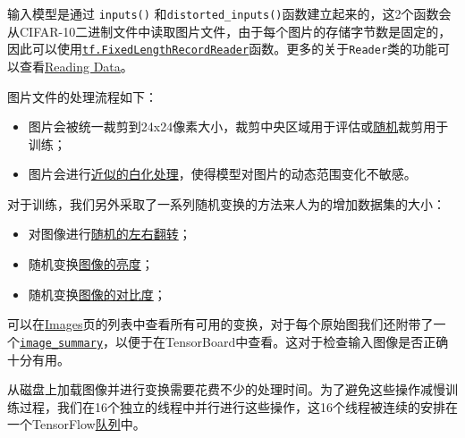 输入模型是通过 \texttt{inputs()}
和\texttt{distorted\_inputs()}函数建立起来的，这2个函数会从CIFAR-10二进制文件中读取图片文件，由于每个图片的存储字节数是固定的，因此可以使用\href{https://github.com/jikexueyuanwiki/tensorflow-zh/blob/master/SOURCE/api_docs/python/io_ops.md\#FixedLengthRecordReader}{\texttt{tf.FixedLengthRecordReader}}函数。更多的关于\texttt{Reader}类的功能可以查看\href{https://github.com/jikexueyuanwiki/tensorflow-zh/blob/master/SOURCE/how_tos/reading_data/index.md\#reading-from-files}{Reading
Data}。

图片文件的处理流程如下：

\begin{itemize}
\tightlist
\item
  图片会被统一裁剪到24x24像素大小，裁剪中央区域用于评估或\href{https://github.com/jikexueyuanwiki/tensorflow-zh/blob/master/SOURCE/api_docs/python/image.md\#random_crop}{随机}裁剪用于训练；
\item
  图片会进行\href{https://github.com/jikexueyuanwiki/tensorflow-zh/blob/master/SOURCE/api_docs/python/image.md\#per_image_whitening}{近似的白化处理}，使得模型对图片的动态范围变化不敏感。
\end{itemize}

对于训练，我们另外采取了一系列随机变换的方法来人为的增加数据集的大小：

\begin{itemize}
\tightlist
\item
  对图像进行\href{https://github.com/jikexueyuanwiki/tensorflow-zh/blob/master/SOURCE/api_docs/python/image.md\#random_flip_left_right}{随机的左右翻转}；
\item
  随机变换\href{https://github.com/jikexueyuanwiki/tensorflow-zh/blob/master/SOURCE/api_docs/python/image.md\#random_brightness}{图像的亮度}；
\item
  随机变换\href{https://github.com/jikexueyuanwiki/tensorflow-zh/blob/master/SOURCE/api_docs/python/image.md\#tf_image_random_contrast}{图像的对比度}；
\end{itemize}

可以在\href{https://github.com/jikexueyuanwiki/tensorflow-zh/blob/master/SOURCE/api_docs/python/image.md}{Images}页的列表中查看所有可用的变换，对于每个原始图我们还附带了一个\href{https://github.com/jikexueyuanwiki/tensorflow-zh/blob/master/SOURCE/api_docs/python/train.md\#image_summary}{\texttt{image\_summary}}，以便于在TensorBoard中查看。这对于检查输入图像是否正确十分有用。

从磁盘上加载图像并进行变换需要花费不少的处理时间。为了避免这些操作减慢训练过程，我们在16个独立的线程中并行进行这些操作，这16个线程被连续的安排在一个TensorFlow\href{https://github.com/jikexueyuanwiki/tensorflow-zh/blob/master/SOURCE/api_docs/python/io_ops.md\#shuffle_batch}{队列}中。

